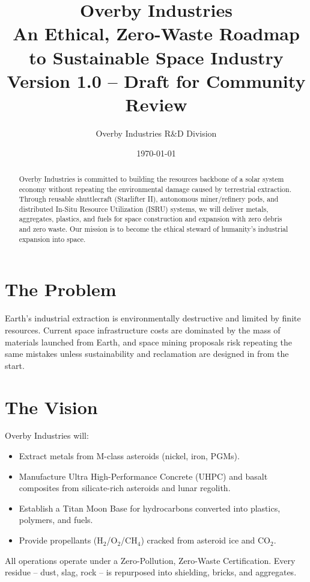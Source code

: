 \documentclass[12pt]{article}
\title{
    \Huge \textbf{Overby Industries} \\[0.5em]
    \Large An Ethical, Zero-Waste Roadmap to Sustainable Space Industry \\[1em]
    {\large Version 1.0 -- Draft for Community Review}
}
\author{Overby Industries R\&D Division}
\date{\today}
\begin{document}
\maketitle
\thispagestyle{empty}

\begin{abstract}
Overby Industries is committed to building the resources backbone of a solar system economy without repeating the environmental damage caused by terrestrial extraction. Through reusable shuttlecraft (Starlifter II), autonomous miner/refinery pods, and distributed In-Situ Resource Utilization (ISRU) systems, we will deliver metals, aggregates, plastics, and fuels for space construction and expansion with zero debris and zero waste. Our mission is to become the ethical steward of humanity's industrial expansion into space.
\end{abstract}

\newpage
\tableofcontents
\newpage

\section{The Problem}
Earth's industrial extraction is environmentally destructive and limited by finite resources. Current space infrastructure costs are dominated by the mass of materials launched from Earth, and space mining proposals risk repeating the same mistakes unless sustainability and reclamation are designed in from the start.

\section{The Vision}
Overby Industries will:
\begin{itemize}
    \item Extract metals from M-class asteroids (nickel, iron, PGMs).
    \item Manufacture Ultra High-Performance Concrete (UHPC) and basalt composites from silicate-rich asteroids and lunar regolith.
    \item Establish a Titan Moon Base for hydrocarbons converted into plastics, polymers, and fuels.
    \item Provide propellants (H$_2$/O$_2$/CH$_4$) cracked from asteroid ice and CO$_2$.
\end{itemize}

All operations operate under a Zero-Pollution, Zero-Waste Certification. Every residue -- dust, slag, rock -- is repurposed into shielding, bricks, and aggregates.
\end{document}
